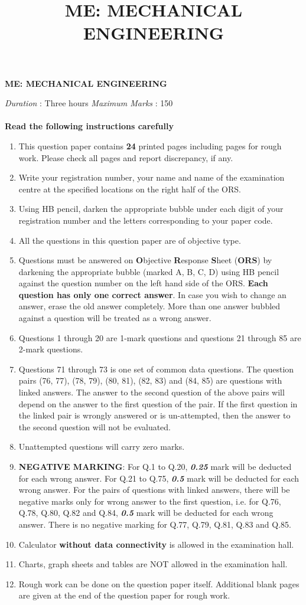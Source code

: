 \documentclass[addpoints,11pt]{exam}
\title{ME: MECHANICAL ENGINEERING}
\begin{document}
\begin{center}
    \Large
    \textbf{ME: MECHANICAL ENGINEERING}
\end{center}

\textit{Duration} : Three hours
\hfill
\textit{Maximum Marks} : 150
\\\\
\textbf{Read the following instructions carefully}
\begin{enumerate}
    \item This question paper contains \textbf{24} printed pages including pages for rough work. Please check all pages and report discrepancy, if any.
    \item Write your registration number, your name and name of the examination centre at the specified locations on the right half of the ORS.
    \item Using HB pencil, darken the appropriate bubble under each digit of your registration number and the letters corresponding to your paper code.
    \item All the questions in this question paper are of objective type.
    \item Questions must be answered on \textbf{O}bjective \textbf{R}esponse \textbf{S}heet (\textbf{ORS}) by darkening the appropriate bubble (marked A, B, C, D) using HB pencil against the question number on the left hand side of the ORS. \textbf{Each question has only one correct answer}. In case you wish to change an answer, erase the old answer completely. More than one answer bubbled against a question will be treated as a wrong answer.
    \item Questions 1 through 20 are 1-mark questions and questions 21 through 85 are 2-mark questions.
    \item Questions 71 through 73 is one set of common data questions. The question pairs (76, 77), (78, 79), (80, 81), (82, 83) and (84, 85) are questions with linked answers. The answer to the second question of the above pairs will depend on the answer to the first question of the pair. If the first question in the linked pair is wrongly answered or is un-attempted, then the answer to the second question will not be evaluated.
    \item Unattempted questions will carry zero marks.
    \item \textbf{NEGATIVE MARKING}: For Q.1 to Q.20, \textit{\textbf{0.25}} mark will be deducted for each wrong answer. For Q.21 to Q.75, \textit{\textbf{0.5}} mark will be deducted for each wrong answer. For the pairs of questions with linked answers, there will be negative marks only for wrong answer to the first question, i.e. for Q.76, Q.78, Q.80, Q.82 and Q.84, \textit{\textbf{0.5}} mark will be deducted for each wrong answer. There is no negative marking for Q.77, Q.79, Q.81, Q.83 and Q.85.
    \item Calculator \textbf{without data connectivity} is allowed in the examination hall.
    \item Charts, graph sheets and tables are NOT allowed in the examination hall.
    \item Rough work can be done on the question paper itself. Additional blank pages are given at the end of the question paper for rough work.
\end{enumerate}
\end{document}
